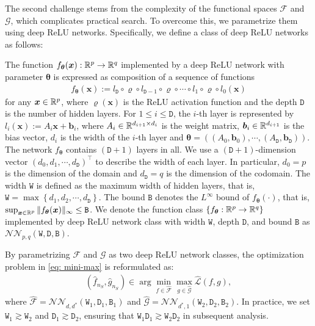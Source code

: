 The second challenge stems from the complexity of the functional spaces $\mathcal{F}$ and $\mathcal{G}$, which complicates practical search. To overcome this, we parametrize them using deep ReLU networks. Specifically, we define a class of deep ReLU networks as follows:
\begin{definition}
\label{def: Deep ReLU networks}
The function $f_{\bm{\theta}}(\bm{x}): \mathbb{R}^p \to \mathbb{R}^q$ implemented by a deep ReLU network with parameter $\bm{\theta}$ is expressed as composition of a sequence of functions
    \begin{align*}
        f_{\bm{\theta}}(\bm{x}) := l_{\mathtt{D}} \circ \varrho \circ l_{\mathtt{D}-1} \circ \varrho \circ \cdots \circ l_1 \circ \varrho \circ l_0(\bm{x})
    \end{align*}
    for any $\bm{x} \in \mathbb{R}^{p}$, where $\varrho(\bm{x})$ is the ReLU activation function and the depth $\mathtt{D}$ is the number of hidden layers. For $1\leq i \leq \mathtt{D}$, the $i$-th layer is represented by $l_i(\bm{x}) := A_i \bm{x} + \bm{b}_i$, where $A_i \in \mathbb{R}^{d_{i+1} \times d_i}$ is the weight matrix, $\bm{b}_i \in \mathbb{R}^{d_{i+1}}$ is the bias vector, $d_i$ is the width of the $i$-th layer and $\bm{\theta} = ((A_0,\bm{b}_0), \cdots,(A_{\mathtt{D}},\bm{b}_{\mathtt{D}}))$.
    The network $f_{\bm{\theta}}$ contains $(\mathtt{D}+1)$ layers in all.
    We use a $(\mathtt{D} + 1)$-dimension vector $(d_0, d_1, \cdots, d_{\mathtt{D}})^{\top}$ to describe the width of each layer.
    In particular, $d_0 = p$ is the dimension of the domain and $d_{\mathtt{D}} = q$ is the dimension of the codomain.
    The width $\mathtt{W}$ is defined as the maximum width of hidden layers, that is, $\mathtt{W} = \max \left\{d_1, d_2, \cdots, d_{\mathtt{D}} \right\}$.
    The bound $\mathtt{B}$ denotes the $L^{\infty}$ bound of $f_{\bm{\theta}}(\cdot)$, that is, $\sup_{\bm{x} \in \mathbb{R}^p} \Vert f_{\bm{\theta}}(\bm{x}) \Vert_{\infty} \le \mathtt{B}$.
    We denote the function class $\{f_{\bm{\theta}}: \mathbb{R}^p \to \mathbb{R}^q\}$ implemented by deep ReLU network class with width $\mathtt{W}$, depth $\mathtt{D}$, and bound $\mathtt{B}$ as $\mathcal{NN}_{p, q}(\mathtt{W}, \mathtt{D}, \mathtt{B})$.
\end{definition}
By parametrizing $\mathcal{F}$ and $\mathcal{G}$ as two deep ReLU network classes, the optimization problem in \eqref{eq: mini-max} is reformulated as:
\begin{align}\label{eq: (hatf, hatg) ∈ argminmaxhatL(f,g)}
    (\hat{f}_{n_S}, \hat{g}_{n_S}) \in \arg\min_{f \in \widehat{\mathcal{F}}}\max_{g \in \widehat{\mathcal{G}}}\widehat{\mathcal{L}}(f, g),
\end{align}
where $\widehat{\mathcal{F}} = \mathcal{NN}_{d, d^*}(\mathtt{W}_1, \mathtt{D}_1, \mathtt{B}_1)$ and $\widehat{\mathcal{G}} = \mathcal{NN}_{d^*, 1}(\mathtt{W}_2, \mathtt{D}_2, \mathtt{B}_2)$. In practice, we set $\mathtt{W}_1 \gtrsim \mathtt{W}_2$ and $\mathtt{D}_1 \gtrsim \mathtt{D}_2$, ensuring that $\mathtt{W}_1\mathtt{D}_1 \gtrsim \mathtt{W}_2\mathtt{D}_2$ in subsequent analysis.

